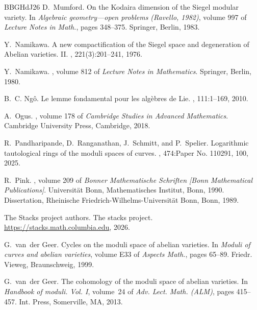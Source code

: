 \documentclass[11pt]{article}
\theoremstyle{definition}
\begin{document}
\begin{thebibliography}{BBGHdJ26}
D.~Mumford.
\newblock On the {K}odaira dimension of the {S}iegel modular variety.
\newblock In {\em Algebraic geometry---open problems ({R}avello, 1982)}, volume 997 of {\em Lecture Notes in Math.}, pages 348--375. Springer, Berlin, 1983.

Y.~Namikawa.
\newblock A new compactification of the {S}iegel space and degeneration of {A}belian varieties. {II}.
, 221(3):201--241, 1976.

Y.~Namikawa.
, volume 812 of {\em Lecture Notes in Mathematics}.
\newblock Springer, Berlin, 1980.

B.~C. Ng{\^o}.
\newblock Le lemme fondamental pour les alg\`ebres de {L}ie.
, 111:1--169, 2010.

A.~Ogus.
, volume 178 of {\em Cambridge Studies in Advanced Mathematics}.
\newblock Cambridge University Press, Cambridge, 2018.

R.~Pandharipande, D.~Ranganathan, J.~Schmitt, and P.~Spelier.
\newblock Logarithmic tautological rings of the moduli spaces of curves.
, 474:Paper No. 110291, 100, 2025.

R.~Pink.
, volume 209 of {\em Bonner Mathematische Schriften [Bonn Mathematical Publications]}.
\newblock Universit\"at Bonn, Mathematisches Institut, Bonn, 1990.
\newblock Dissertation, Rheinische Friedrich-Wilhelms-Universit\"at Bonn, Bonn, 1989.

The {Stacks project authors}.
\newblock The stacks project.
\newblock \url{https://stacks.math.columbia.edu}, 2026.

G.~van~der Geer.
\newblock Cycles on the moduli space of abelian varieties.
\newblock In {\em Moduli of curves and abelian varieties}, volume E33 of {\em Aspects Math.}, pages 65--89. Friedr. Vieweg, Braunschweig, 1999.

G.~van~der Geer.
\newblock The cohomology of the moduli space of abelian varieties.
\newblock In {\em Handbook of moduli. {V}ol. {I}}, volume~24 of {\em Adv. Lect. Math. (ALM)}, pages 415--457. Int. Press, Somerville, MA, 2013.

\end{thebibliography}
\end{document}
